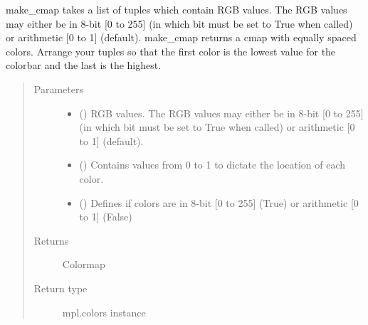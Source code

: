 \documentclass[letterpaper,10pt,english,openany,oneside]{sphinxmanual}
\begin{document}

\begin{fulllineitems}
\label{\detokenize{pygpc:pygpc.Visualization.make_cmap}}
make\_cmap takes a list of tuples which contain RGB values. The RGB
values may either be in 8-bit {[}0 to 255{]} (in which bit must be set to
True when called) or arithmetic {[}0 to 1{]} (default). make\_cmap returns
a cmap with equally spaced colors.
Arrange your tuples so that the first color is the lowest value for the
colorbar and the last is the highest.
\begin{quote}\begin{description}
\item[{Parameters}] \leavevmode\begin{itemize}
\item {} 
 (\sphinxstyleliteralemphasis{\sphinxupquote{ {[}}}\sphinxstyleliteralemphasis{\sphinxupquote{{]}}}) \textendash{} RGB values. The RGB values may either be in 8-bit {[}0 to 255{]} (in which bit must be set to True when called)
or arithmetic {[}0 to 1{]} (default).

\item {} 
 (\sphinxstyleliteralemphasis{\sphinxupquote{ {[}}}\sphinxstyleliteralemphasis{\sphinxupquote{{]}}}\sphinxstyleliteralemphasis{\sphinxupquote{, }}\sphinxstyleliteralemphasis{\sphinxupquote{, }}) \textendash{} Contains values from 0 to 1 to dictate the location of each color.

\item {} 
 (\sphinxstyleliteralemphasis{\sphinxupquote{, }}\sphinxstyleliteralemphasis{\sphinxupquote{, }}) \textendash{} Defines if colors are in 8-bit {[}0 to 255{]} (True) or arithmetic {[}0 to 1{]} (False)

\end{itemize}

\item[{Returns}] \leavevmode
{} \textendash{} Colormap

\item[{Return type}] \leavevmode
mpl.colors instance

\end{description}\end{quote}

\end{fulllineitems}
\end{document}
